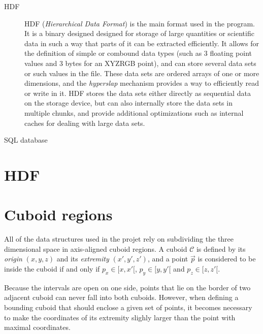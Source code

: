 \documentclass[a4paper,10pt,abstracton,notitlepage]{scrreprt}
\begin{document}
\begin{description}
\item[HDF] HDF (\emph{Hierarchical Data Format}) is the main format used in the program. It is a binary designed designed for storage of large quantities or scientific data in such a way that parts of it can be extracted efficiently. It allows for the definition of simple or combound data types (such as 3 floating point values and 3 bytes for an XYZRGB point), and can store several data sets or such values in the file. These data sets are ordered arrays of one or more dimensions, and the \emph{hyperslap} mechanism provides a way to efficiently read or write in it. HDF stores the data sets either directly as sequential data on the storage device, but can also internally store the data sets in multiple chunks, and provide additional optimizations such as internal caches for dealing with large data sets.
\item[SQL database] 
\end{description}

\section{HDF}

\section{Cuboid regions} \label{sec:cub_reg}
All of the data structures used in the projet rely on subdividing the three dimensional space in axis-aligned cuboid regions. A cuboid $\mathcal{C}$ is defined by its \emph{origin} $(x, y, z)$ and its \emph{extremity} $(x', y', z')$, and a point $\overrightarrow{p}$ is considered to be inside the cuboid if and only if $p_{x} \in [x, x'[$, $p_{y} \in [y, y'[$ and $p_{z} \in [z, z'[$.

Because the intervals are open on one side, points that lie on the border of two adjacent cuboid can never fall into both cuboids. However, when defining a bounding cuboid that should enclose a given set of points, it becomes necessary to make the coordinates of its extremity slighly larger than the point with maximal coordinates.
\end{document}
